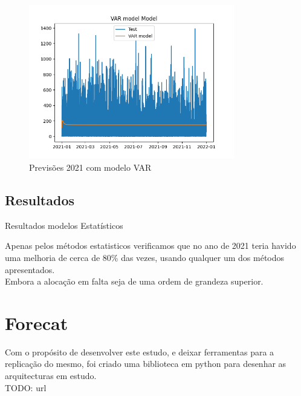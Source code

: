 \begin{figure}[H]
    \centering
    \includegraphics[width=0.8\textwidth]{../plots/VAR model_model.png}
    \caption{Previsões 2021 com modelo VAR}
    \label{fig:VAR_model}
\end{figure}









\subsection{Resultados\label{se:statitics_scores}}

\begin{table}[H]
    \caption{Resultados modelos Estatísticos}
    \resizebox{\linewidth}{!}{\label{tb:statitics_scores}}      
\end{table}

Apenas pelos métodos estatisticos verificamos que no ano de 2021 teria havido uma melhoria de cerca de 80\% das vezes, usando qualquer um dos métodos apresentados.\\
Embora a alocação em falta seja de uma ordem de grandeza superior.\\


\section{Forecat\label{se:forecat}}


Com o propósito de desenvolver este estudo, e deixar ferramentas para a replicação do mesmo, foi criado uma biblioteca em python para desenhar as arquitecturas em estudo.\\
TODO: url

